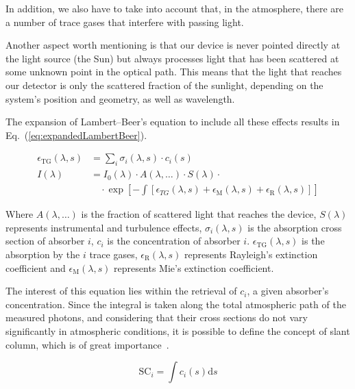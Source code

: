 In addition, we also have to take into account that, in the atmosphere,
there are a number of trace gases that interfere with passing light.

Another aspect worth mentioning is that our device is never pointed
directly at the light source (the Sun) but always processes light that
has been scattered at some unknown point in the optical path. This means
that the light that reaches our detector is only the scattered fraction
of the sunlight, depending on the system's position and geometry, as
well as wavelength.

The expansion of Lambert--Beer's equation to include all these effects
results in Eq.~(\ref{eq:expandedLambertBeer}).

\begin{equation}
    \label{eq:expandedLambertBeer}
    \begin{aligned}
        \epsilon_\mathrm{TG}(\lambda, s)&=\sum_{i} \sigma_{i}(\lambda, s)
            \cdot c_{i}(s)\\
       I(\lambda) &= I_0(\lambda) \cdot A(\lambda, \ldots) \cdot
            S(\lambda) \cdot\\
                   &\quad\cdot \exp \left[ -\int \left[
                       \epsilon_{TG}(\lambda, s) +
                           \epsilon_{\mathrm{M}}(\lambda, s) +
                               \epsilon_{\mathrm{R}}(\lambda, s)  \right] \right] 
    \end{aligned}
\end{equation}

Where $A(\lambda, \ldots)$ is the fraction of scattered light that
reaches the device, $S(\lambda)$ represents instrumental and turbulence
effects, $\sigma_{i}(\lambda, s)$ is the absorption cross section of
absorber $i$, $c_{i}$ is the concentration of absorber $i$.
$\epsilon_{\mathrm{TG}}(\lambda, s)$ is the absorption by the $i$ trace gases,
$\epsilon_\mathrm{R}(\lambda, s)$ represents Rayleigh's extinction
coefficient and $\epsilon_\mathrm{M}(\lambda, s)$ represents Mie's
extinction coefficient.

The interest of this equation lies within the retrieval of $c_i$, a
given absorber's concentration. Since the integral is taken along the
total atmospheric path of the measured photons, and considering that
their cross sections do not vary significantly in atmospheric
conditions, it is possible to define the concept of slant column, which
is of great importance~\cite{Merlaud2013}.

\begin{equation}
      \label{eq:slantColumn}
      \mathrm{SC}_{i} = \int c_{i}(s)\mathrm{d}s
\end{equation}

